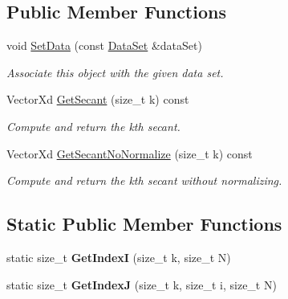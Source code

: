 \subsection*{Public Member Functions}
\begin{DoxyCompactItemize}
\item 
\hypertarget{struct_d_r_d_s_p_1_1_secants_data_a1c1383e3f4eca99473eba63d7a50a024}{void \hyperlink{struct_d_r_d_s_p_1_1_secants_data_a1c1383e3f4eca99473eba63d7a50a024}{Set\-Data} (const \hyperlink{struct_d_r_d_s_p_1_1_data_set}{Data\-Set} \&data\-Set)}\label{struct_d_r_d_s_p_1_1_secants_data_a1c1383e3f4eca99473eba63d7a50a024}

\begin{DoxyCompactList}\small\item\em Associate this object with the given data set. \end{DoxyCompactList}\item 
\hypertarget{struct_d_r_d_s_p_1_1_secants_data_a82585a040aebaa63bc5b1b40a79f99eb}{Vector\-Xd \hyperlink{struct_d_r_d_s_p_1_1_secants_data_a82585a040aebaa63bc5b1b40a79f99eb}{Get\-Secant} (size\-\_\-t k) const }\label{struct_d_r_d_s_p_1_1_secants_data_a82585a040aebaa63bc5b1b40a79f99eb}

\begin{DoxyCompactList}\small\item\em Compute and return the kth secant. \end{DoxyCompactList}\item 
\hypertarget{struct_d_r_d_s_p_1_1_secants_data_a17468fc67c5ae42306af7fecee7b7dc9}{Vector\-Xd \hyperlink{struct_d_r_d_s_p_1_1_secants_data_a17468fc67c5ae42306af7fecee7b7dc9}{Get\-Secant\-No\-Normalize} (size\-\_\-t k) const }\label{struct_d_r_d_s_p_1_1_secants_data_a17468fc67c5ae42306af7fecee7b7dc9}

\begin{DoxyCompactList}\small\item\em Compute and return the kth secant without normalizing. \end{DoxyCompactList}\end{DoxyCompactItemize}
\subsection*{Static Public Member Functions}
\begin{DoxyCompactItemize}
\item 
\hypertarget{struct_d_r_d_s_p_1_1_secants_data_a79349cda54663e51ff26f79d97b30e43}{static size\-\_\-t {\bfseries Get\-Index\-I} (size\-\_\-t k, size\-\_\-t N)}\label{struct_d_r_d_s_p_1_1_secants_data_a79349cda54663e51ff26f79d97b30e43}

\item 
\hypertarget{struct_d_r_d_s_p_1_1_secants_data_ae4382e9c8861f3a10e031495eda2c998}{static size\-\_\-t {\bfseries Get\-Index\-J} (size\-\_\-t k, size\-\_\-t i, size\-\_\-t N)}\label{struct_d_r_d_s_p_1_1_secants_data_ae4382e9c8861f3a10e031495eda2c998}

\end{DoxyCompactItemize}
